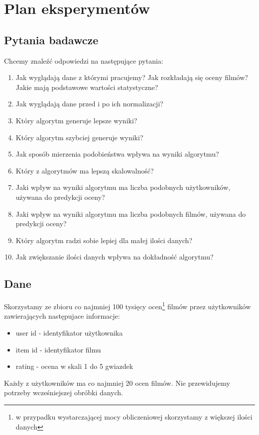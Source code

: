 \documentclass[12pt, a4paper]{article}
\begin{document}
\section{Plan eksperymentów}

\subsection{Pytania badawcze}
Chcemy znaleźć odpowiedzi na następujące pytania:

\begin{enumerate}
\item Jak wyglądają dane z którymi pracujemy? Jak rozkładają się oceny filmów? Jakie mają podstawowe wartości statystyczne?
\item Jak wyglądają dane przed i po ich normalizacji?
\item Który algorytm generuje lepsze wyniki?
\item Który algorytm szybciej generuje wyniki?
\item Jak sposób mierzenia podobieństwa wpływa na wyniki algorytmu?
\item Który z algorytmów ma lepszą skalowalność?
\item Jaki wpływ na wyniki algorytmu ma liczba podobnych użytkowników, używana do predykcji oceny?
\item Jaki wpływ na wyniki algorytmu ma liczba podobnych filmów, używana do predykcji oceny?
\item Który algorytm radzi sobie lepiej dla małej ilości danych?
\item Jak zwiększanie ilości danych wpływa na dokładność algorytmu?
\end{enumerate}

\subsection{Dane}
Skorzystamy ze zbioru co najmniej 100 tysięcy ocen\footnote{w przypadku wystarczającej mocy
obliczeniowej skorzystamy z większej ilości danych} filmów przez użytkowników zawierających
następujace informacje:

\begin{itemize}
\item user id - identyfikator użytkownika
\item item id - identyfikator filmu
\item rating - ocena w skali 1 do 5 gwiazdek
\end{itemize}

Każdy z użytkowników ma co najmniej 20 ocen filmów. Nie przewidujemy potrzeby wcześniejszej obróbki danych.
\end{document}
